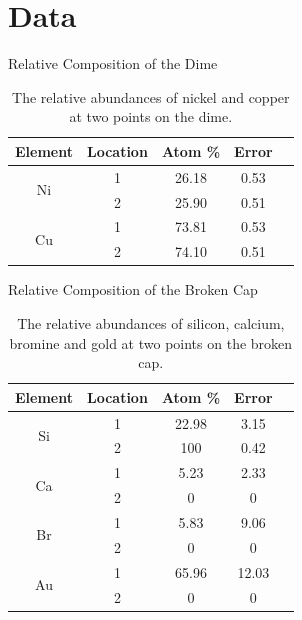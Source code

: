 \documentclass[10pt]{IEEEtran}
\begin{document}
\section{Data}
    
        \begin{table}[!hpbt]
      \begin{center}
        \normalsize{Relative Composition of the Dime}
        \begin{tabular}{|c|c|c|c|c|}	
		   \hline        	
		   Element & Location & Atom \% & Error \\
            \hline
            \multirow{2}{*}{Ni} & 1 & 26.18 & 0.53 \\
            \hhline{~----}
	        & 2 & 25.90 & 0.51 \\
	        \hline
            \multirow{2}{*}{Cu} & 1 & 73.81 & 0.53 \\
            \hhline{~----}
            & 2 & 74.10 & 0.51 \\
            \hline
       \end{tabular}
       \caption{The relative abundances of nickel and copper at two points on the dime.}
       \label{tab:dime}
      \end{center}
    \end{table}
    
        \begin{table}[!hpbt]
      \begin{center}
        \normalsize{Relative Composition of the Broken Cap}
        \begin{tabular}{|c|c|c|c|c|}	
		   \hline        	
		   Element & Location & Atom \% & Error \\
            \hline
            \multirow{2}{*}{Si} & 1 & 22.98 & 3.15 \\
            \hhline{~----}
	        & 2 & 100 & 0.42 \\
	        \hline
            \multirow{2}{*}{Ca} & 1 & 5.23 & 2.33 \\
            \hhline{~----}
            & 2 & 0 & 0 \\
            \hline           
            \multirow{2}{*}{Br} & 1 & 5.83 & 9.06 \\
            \hhline{~----}
            & 2 & 0 & 0 \\
            \hline           
             \multirow{2}{*}{Au} & 1 & 65.96 & 12.03 \\
            \hhline{~----}
            & 2 & 0 & 0 \\
            \hline
       \end{tabular}
       \caption{The relative abundances of silicon, calcium, bromine and gold at two points on the broken cap.}
       \label{tab:object2}
      \end{center}
    \end{table}
    
\end{document}
